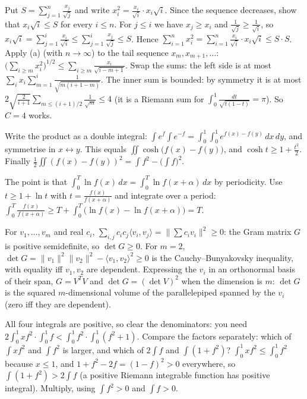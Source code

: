\documentclass[11pt,a4paper]{article}
\begin{document}
 Put $S=\sum_{j=1}^n\frac{x_j}{\sqrt j}$ and write $x_i^2=\frac{x_i}{\sqrt i}\cdot x_i\sqrt i$. Since the sequence decreases, show that $x_i\sqrt i\le S$ for every $i\le n$.
 For $j\le i$ we have $x_j\ge x_i$ and $\frac1{\sqrt j}\ge\frac1{\sqrt i}$, so $x_i\sqrt i=\sum_{j=1}^i\frac{x_i}{\sqrt i}\le\sum_{j=1}^i\frac{x_j}{\sqrt j}\le S$. Hence $\sum_{i=1}^nx_i^2=\sum_{i=1}^n\frac{x_i}{\sqrt i}\cdot x_i\sqrt i\le S\cdot S$.
 Apply (a) (with $n\to\infty$) to the tail sequence $x_m,x_{m+1},\dots$: $\big(\sum_{i\ge m}x_i^2\big)^{1/2}\le\sum_{i\ge m}\frac{x_i}{\sqrt{i-m+1}}$.
 Swap the sums: the left side is at most $\sum_ix_i\sum_{m=1}^i\frac1{\sqrt{m(i+1-m)}}$. The inner sum is bounded: by symmetry it is at most $2\sqrt{\frac2{i+1}}\sum_{m\le(i+1)/2}\frac1{\sqrt m}\le4$ (it is a Riemann sum for $\int_0^1\frac{dt}{\sqrt{t(1-t)}}=\pi$). So $C=4$ works.

 Write the product as a double integral: $\int e^f\int e^{-f}=\int_0^1\!\int_0^1e^{f(x)-f(y)}\,dx\,dy$, and symmetrise in $x\leftrightarrow y$.
 This equals $\iint\cosh\big(f(x)-f(y)\big)$, and $\cosh t\ge1+\frac{t^2}2$. Finally $\frac12\iint(f(x)-f(y))^2=\int f^2-\big(\int f\big)^2$.

 The point is that $\int_0^T\ln f(x)\,dx=\int_0^T\ln f(x+\alpha)\,dx$ by periodicity.
 Use $t\ge1+\ln t$ with $t=\frac{f(x)}{f(x+\alpha)}$ and integrate over a period: $\int_0^T\frac{f(x)}{f(x+\alpha)}\ge T+\int_0^T\big(\ln f(x)-\ln f(x+\alpha)\big)=T$.

 For $v_1,\dots,v_m$ and real $c_i$, $\sum_{i,j}c_ic_j\langle v_i,v_j\rangle=\big\|\sum c_iv_i\big\|^2\ge0$: the Gram matrix $G$ is positive semidefinite, so $\det G\ge0$.
 For $m=2$, $\det G=\|v_1\|^2\|v_2\|^2-\langle v_1,v_2\rangle^2\ge0$ is the Cauchy--Bunyakovsky inequality, with equality iff $v_1,v_2$ are dependent.
 Expressing the $v_i$ in an orthonormal basis of their span, $G=V^TV$ and $\det G=(\det V)^2$ when the dimension is $m$: $\det G$ is the squared $m$-dimensional volume of the parallelepiped spanned by the $v_i$ (zero iff they are dependent).

 All four integrals are positive, so clear the denominators: you need $2\int_0^1xf^2\cdot\int_0^1f<\int_0^1f^2\cdot\int_0^1(f^2+1)$. Compare the factors separately: which of $\int xf^2$ and $\int f^2$ is larger, and which of $2\int f$ and $\int(1+f^2)$?
 $\int_0^1xf^2\le\int_0^1f^2$ because $x\le1$, and $1+f^2-2f=(1-f)^2>0$ everywhere, so $\int(1+f^2)>2\int f$ (a positive Riemann integrable function has positive integral). Multiply, using $\int f^2>0$ and $\int f>0$.
\end{document}
